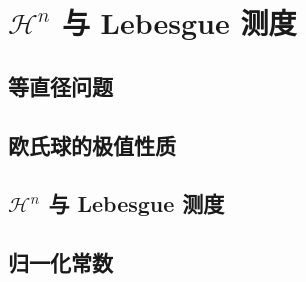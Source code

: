 \section{\texorpdfstring{\(\mathcal H^n\)}{Hⁿ} 与 Lebesgue 测度}
\label{b1:sec:1503}


\subsection{等直径问题}
\label{b1:subsec:150301}

\subsection{欧氏球的极值性质}
\label{b1:subsec:150302}

\subsection{\texorpdfstring{\(\mathcal H^n\)}{m} 与 Lebesgue 测度}
\label{b1:subsec:150303}

\subsection{归一化常数}
\label{b1:subsec:150304}


